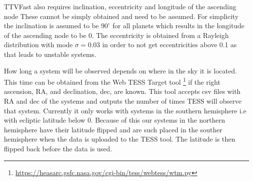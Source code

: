 \documentclass[12pt]{report}
\begin{document}
	TTVFast also requires inclination, eccentricity and longitude of the ascending node These cannot be simply obtained and need to be assumed. For simplicity the inclination is assumed to be $90^{\circ}$ for all planets which results in the longitude of the ascending node to be 0. The eccentricity is obtained from a Rayleigh distribution with mode $\sigma = 0.03$ in order to not get eccentricities above 0.1 as that leads to unstable systems.  
	
	How long a system will be observed depends on where in the sky it is located. This time can be obtained from the Web TESS Target tool \footnote{\url{https://heasarc.gsfc.nasa.gov/cgi-bin/tess/webtess/wtm.py}} if the right ascension, RA, and declination, dec, are known. This tool accepts csv files with RA and dec of the systems and outputs the number of times TESS will observe that system. Currently it only works with systems in the southern hemisphere i.e with ecliptic latitude below 0. Because of this our systems in the northern hemisphere have their latitude flipped and are such placed in the souther hemisphere when the data is uploaded to the TESS tool. The latitude is then flipped back before the data is used. 
	
\end{document}

